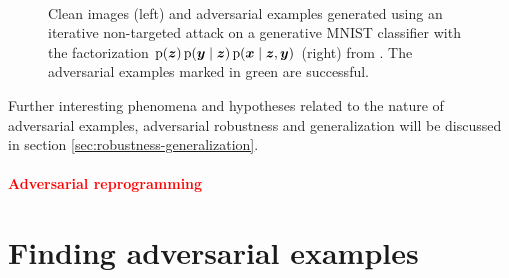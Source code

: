 \documentclass[oneside]{book}
\begin{document}
\begin{figure}[htbp!]
	\begin{center}
		\
	\end{center}
	\caption{Clean images (left) and adversarial examples generated using an iterative non-targeted attack on a generative MNIST \citep{LeCun:2015:DL} classifier with the factorization $\p(\vec z)\p(\vec y\mid\vec z)\p(\vec x\mid\vec z,\vec y)$ (right) from \citet{Li:2019:AGCMRAA}. The adversarial examples marked in green are successful.}
	\label{fig:li-gfz-adversarial-examples-mnist}
\end{figure}

Further interesting phenomena and hypotheses related to the nature of adversarial examples, adversarial robustness and generalization will be discussed in section \ref{sec:robustness-generalization}.

\paragraph{\textcolor{red}{Adversarial reprogramming}}  %


\section{Finding adversarial examples} \label{sec:finding-adversarial-examples}
\end{document}
